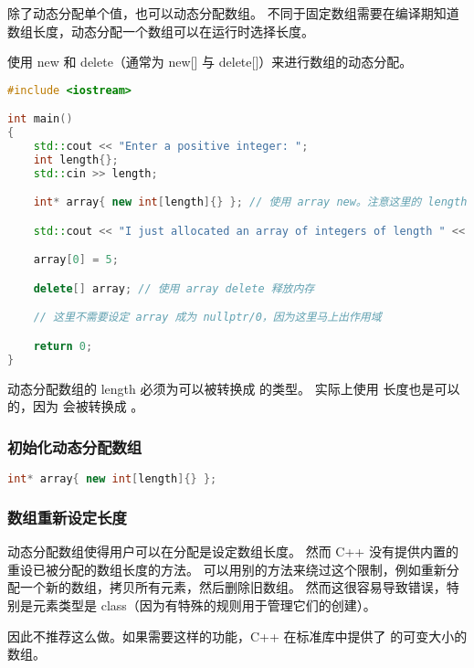 \documentclass[../../LearnCpp.tex]{subfiles}
\begin{document}

除了动态分配单个值，也可以动态分配数组。
不同于固定数组需要在编译期知道数组长度，动态分配一个数组可以在运行时选择长度。

使用 new 和 delete（通常为 new[] 与 delete[]）来进行数组的动态分配。

\begin{lstlisting}[language=C++]
#include <iostream>

int main()
{
    std::cout << "Enter a positive integer: ";
    int length{};
    std::cin >> length;

    int* array{ new int[length]{} }; // 使用 array new。注意这里的 length 不再需要是常量！

    std::cout << "I just allocated an array of integers of length " << length << '\n';

    array[0] = 5;

    delete[] array; // 使用 array delete 释放内存

    // 这里不需要设定 array 成为 nullptr/0，因为这里马上出作用域

    return 0;
}
\end{lstlisting}

动态分配数组的 length 必须为可以被转换成  的类型。
实际上使用  长度也是可以的，因为  会被转换成 。

\subsubsection*{初始化动态分配数组}

\begin{lstlisting}[language=C++]
int* array{ new int[length]{} };
\end{lstlisting}

\subsubsection*{数组重新设定长度}

动态分配数组使得用户可以在分配是设定数组长度。
然而 C++ 没有提供内置的重设已被分配的数组长度的方法。
可以用别的方法来绕过这个限制，例如重新分配一个新的数组，拷贝所有元素，然后删除旧数组。
然而这很容易导致错误，特别是元素类型是 class（因为有特殊的规则用于管理它们的创建）。

因此不推荐这么做。如果需要这样的功能，C++ 在标准库中提供了  的可变大小的数组。
\end{document}
